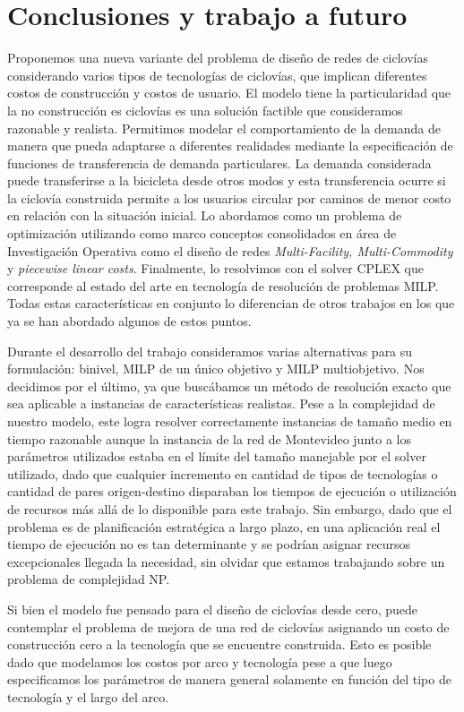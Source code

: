\chapter{Conclusiones y trabajo a futuro}

Proponemos una nueva variante del problema de diseño de redes de ciclovías considerando varios tipos de tecnologías de ciclovías, que implican diferentes costos de construcción y costos de usuario. El modelo tiene la particularidad que la no construcción es ciclovías es una solución factible que consideramos razonable y realista. Permitimos modelar el comportamiento de la demanda de manera que pueda adaptarse a diferentes realidades mediante la especificación de funciones de transferencia de demanda particulares. La demanda considerada puede transferirse a la bicicleta desde otros modos y esta transferencia ocurre si la ciclovía construida permite a los usuarios circular por caminos de menor costo en relación con la situación inicial. Lo abordamos como un problema de optimización utilizando como marco conceptos consolidados en área de Investigación Operativa como el diseño de redes {\it Multi-Facility, Multi-Commodity} y {\it piecewise linear costs}. Finalmente, lo resolvimos con el solver CPLEX que corresponde al estado del arte en tecnología de resolución de problemas MILP. Todas estas características en conjunto lo diferencian de otros trabajos en los que ya se han abordado algunos de estos puntos.

Durante el desarrollo del trabajo consideramos varias alternativas para su formulación: binivel, MILP de un único objetivo y MILP multiobjetivo. Nos decidimos por el último, ya que buscábamos un método de resolución exacto que sea aplicable a instancias de características realistas. Pese a la complejidad de nuestro modelo, este logra resolver correctamente instancias de tamaño medio en tiempo razonable aunque la instancia de la red de Montevideo junto a los parámetros utilizados estaba en el límite del tamaño manejable por el solver utilizado, dado que cualquier incremento en cantidad de tipos de tecnologías o cantidad de pares origen-destino disparaban los tiempos de ejecución o utilización de recursos más allá de lo disponible para este trabajo. Sin embargo, dado que el problema es de planificación estratégica a largo plazo, en una aplicación real el tiempo de ejecución no es tan determinante y se podrían asignar recursos excepcionales llegada la necesidad, sin olvidar que estamos trabajando sobre un problema de complejidad NP.

Si bien el modelo fue pensado para el diseño de ciclovías desde cero, puede contemplar el problema de mejora de una red de ciclovías asignando un costo de construcción cero a la tecnología que se encuentre construida. Esto es posible dado que modelamos los costos por arco y tecnología pese a que luego especificamos los parámetros de manera general solamente en función del tipo de tecnología y el largo del arco.

